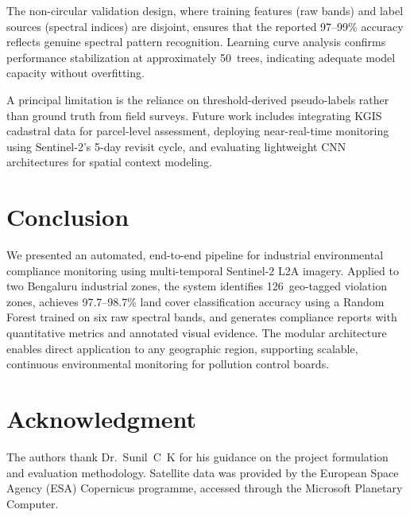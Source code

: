 \documentclass[conference,10pt]{IEEEtran}
\begin{document}
The non-circular validation design, where training features (raw bands) and label sources (spectral indices) are disjoint, ensures that the reported 97--99\% accuracy reflects genuine spectral pattern recognition. Learning curve analysis confirms performance stabilization at approximately 50~trees, indicating adequate model capacity without overfitting.

A principal limitation is the reliance on threshold-derived pseudo-labels rather than ground truth from field surveys. Future work includes integrating KGIS cadastral data for parcel-level assessment, deploying near-real-time monitoring using Sentinel-2's 5-day revisit cycle, and evaluating lightweight CNN architectures for spatial context modeling.

\section{Conclusion}

We presented an automated, end-to-end pipeline for industrial environmental compliance monitoring using multi-temporal Sentinel-2 L2A imagery. Applied to two Bengaluru industrial zones, the system identifies 126~geo-tagged violation zones, achieves 97.7--98.7\% land cover classification accuracy using a Random Forest trained on six raw spectral bands, and generates compliance reports with quantitative metrics and annotated visual evidence. The modular architecture enables direct application to any geographic region, supporting scalable, continuous environmental monitoring for pollution control boards.

\section*{Acknowledgment}

The authors thank Dr.~Sunil~C~K for his guidance on the project formulation and evaluation methodology. Satellite data was provided by the European Space Agency (ESA) Copernicus programme, accessed through the Microsoft Planetary Computer.
\end{document}
